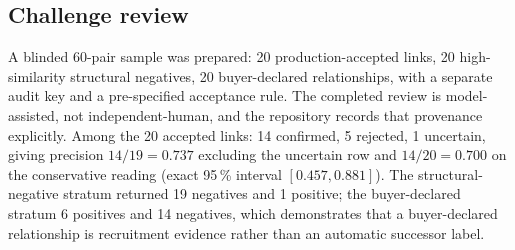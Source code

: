 \subsection*{Challenge review}

A blinded 60-pair sample was prepared: 20 production-accepted links, 20 high-similarity structural negatives,
20 buyer-declared relationships, with a separate audit key and a pre-specified acceptance rule. The completed
review is model-assisted, not independent-human, and the repository records that provenance explicitly. Among
the 20 accepted links: 14 confirmed, 5 rejected, 1 uncertain, giving precision $14/19 = 0.737$ excluding the
uncertain row and $14/20 = 0.700$ on the conservative reading (exact 95\,\% interval $[0.457, 0.881]$). The
structural-negative stratum returned 19 negatives and 1 positive; the buyer-declared stratum 6 positives and
14 negatives, which demonstrates that a buyer-declared relationship is recruitment evidence rather than an
automatic successor label.
